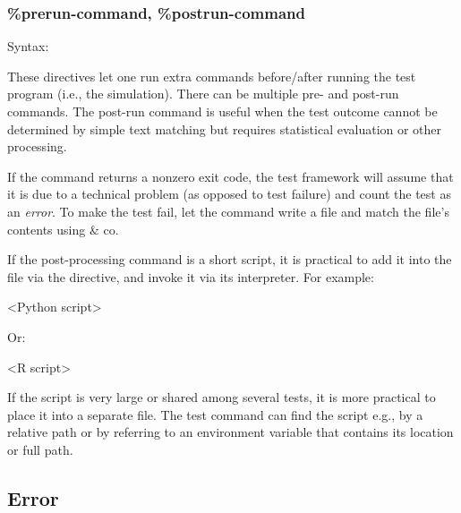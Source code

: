 \subsubsection{\%prerun-command, \%postrun-command}
\label{sec:testing:opptest:prerun-postrun-commands}

Syntax:

\begin{filelisting}
\end{filelisting}

\begin{filelisting}
\end{filelisting}

These directives let one run extra commands before/after running the test
program (i.e., the simulation). There can be multiple pre- and post-run
commands. The post-run command is useful when the test outcome cannot be determined
by simple text matching but requires statistical evaluation or other processing.

If the command returns a nonzero exit code, the test framework will assume that
it is due to a technical problem (as opposed to test failure) and count the
test as an \textit{error}. To make the test fail, let the command write a
file and match the file's contents using  \& co.

If the post-processing command is a short script, it is practical
to add it into the  file via the  directive,
and invoke it via its interpreter. For example:

\begin{filelisting}
<Python script>
\end{filelisting}

Or:

\begin{filelisting}
<R script>
\end{filelisting}

If the script is very large or shared among several tests, it is more practical
to place it into a separate file. The test command can find the script e.g.,
by a relative path or by referring to an environment variable that contains
its location or full path.


\subsection{Error}
\label{sec:testing:opptest:error}

